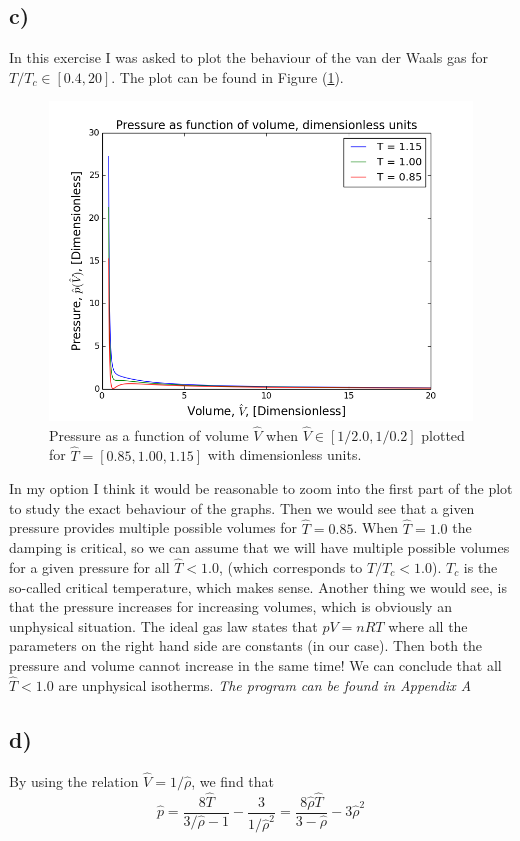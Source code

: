 \documentclass{scrartcl}
\begin{document}
\subsection*{c)}
In this exercise I was asked to plot the behaviour of the van der Waals gas for $T/T_c\in[0.4,20]$. The plot can be found in Figure (\ref{fig:behav}).
\begin{figure}[H]
\centering
\includegraphics[width=120mm]{oblig3_1.png}
\caption{Pressure as a function of volume $\hat{V}$ when $\hat{V}\in[1/2.0, 1/0.2]$ plotted for $\hat{T}=[0.85, 1.00, 1.15]$ with dimensionless units.}
\label{fig:behav}
\end{figure}
In my option I think it would be reasonable to zoom into the first part of the plot to study the exact behaviour of the graphs. Then we would see that a given pressure provides multiple possible volumes for $\hat{T}=0.85$. When $\hat{T}=1.0$ the damping is critical, so we can assume that we will have multiple possible volumes for a given pressure for all $\hat{T}<1.0$, (which corresponds to $T/T_c<1.0$). $T_c$ is the so-called critical temperature, which makes sense. Another thing we would see, is that the pressure increases for increasing volumes, which is obviously an unphysical situation. The ideal gas law states that $pV=nRT$ where all the parameters on the right hand side are constants (in our case). Then both the pressure and volume cannot increase in the same time! We can conclude that all $\hat{T}<1.0$ are unphysical isotherms. \newline\textit{The program can be found in Appendix A}

\subsection*{d)}
By using the relation $\hat{V}=1/\hat{\rho}$, we find that
\begin{equation}
\hat{p}=\frac{8\hat{T}}{3/\hat{\rho}-1}-\frac{3}{1/\hat{\rho}^2}=\frac{8\hat{\rho}\hat{T}}{3-\hat{\rho}}-3\hat{\rho}^2
\end{equation}
\end{document}

